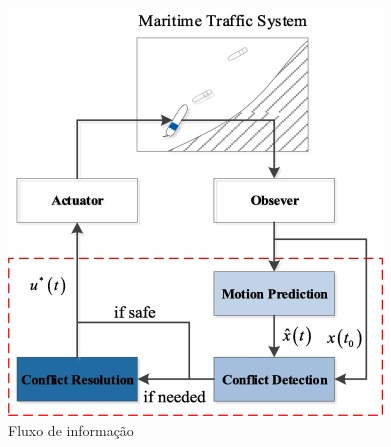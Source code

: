         \begin{figure}
            \centering
            \includegraphics{fig/information_flow.png}
            \caption{Fluxo de informação ~\cite{HUANG2020451}}
            \label{fig:col_avoid_info_flow}
        \end{figure}
        
        